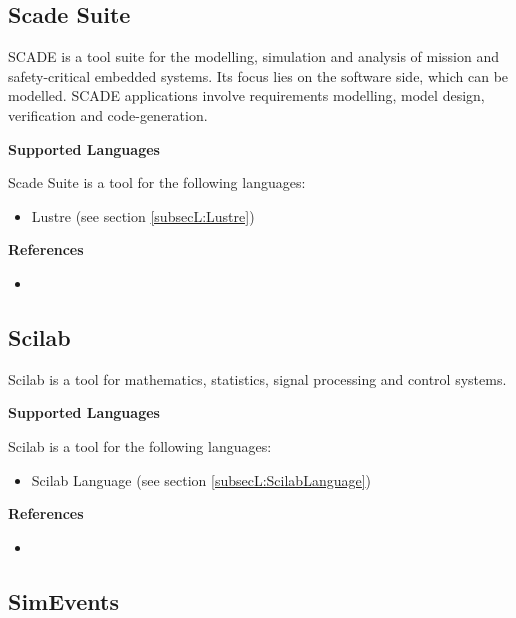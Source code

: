 \subsection{Scade Suite}
\label{subsecT:SCADE-Suite}


SCADE is a tool suite for the modelling, simulation and analysis of mission and safety-critical embedded systems. Its focus lies on the software side, which can be modelled. SCADE applications involve requirements modelling, model design, verification and code-generation.

\textbf{Supported Languages}

Scade Suite is a tool for the following languages:
\begin{itemize}
	\item Lustre (see section \ref{subsecL:Lustre})
\end{itemize}


\textbf{References}
\begin{itemize}
	
\item {}
\end{itemize}



\subsection{Scilab}
\label{subsecT:Scilab}


Scilab is a tool for mathematics, statistics, signal processing and control systems.

\textbf{Supported Languages}

Scilab is a tool for the following languages:
\begin{itemize}
	\item Scilab Language (see section \ref{subsecL:ScilabLanguage})
\end{itemize}


\textbf{References}
\begin{itemize}
	
\item {}
\end{itemize}



\subsection{SimEvents}
\label{subsecT:SimEvents}


